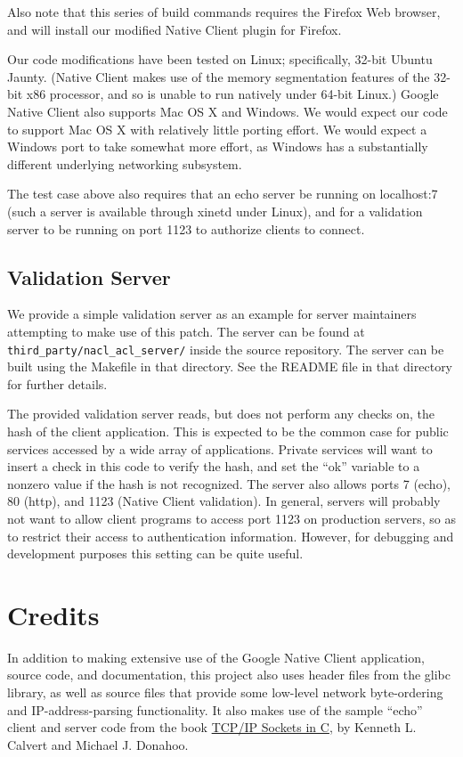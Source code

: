 \documentclass[a4paper,10pt]{article}
\begin{document}
Also note that this series of build commands requires the Firefox Web browser,
and will install our modified Native Client plugin for Firefox.

Our code modifications have been tested on Linux; specifically, 32-bit Ubuntu
Jaunty.  (Native Client makes use of the memory segmentation features of
the 32-bit x86 processor, and so is unable to run natively under 64-bit Linux.)
Google Native Client also supports Mac OS X and Windows. We would expect our
code to support Mac OS X with relatively little porting effort. We would expect
a Windows port to take somewhat more effort, as Windows has a substantially
different underlying networking subsystem.

The test case above also requires that an echo server be running on
localhost:7 (such a server is available through xinetd under Linux), and for a
validation server to be running on port 1123 to authorize clients to connect.

\subsection{Validation Server}

We provide a simple validation server as an example for server maintainers
attempting to make use of this patch.  The server can be found at
\texttt{third\_party/nacl\_acl\_server/} inside the source repository.  The
server can be built using the Makefile in that directory.  See the README file
in that directory for further details.

The provided validation server reads, but does not perform any checks on, the
hash of the client application.  This is expected to be the common case for
public services accessed by a wide array of applications.  Private services
will want to insert a check in this code to verify the hash, and set the ``ok''
variable to a nonzero value if the hash is not recognized.  The server also
allows ports 7 (echo), 80 (http), and 1123 (Native Client validation).  In
general, servers will probably not want to allow client programs to access port
1123 on production servers, so as to restrict their access to authentication
information. However, for debugging and development purposes this setting can be
quite useful.

\section{Credits}

In addition to making extensive use of the Google Native Client application,
source code, and documentation, this project also uses header files from
the glibc library,  as well as source files that provide some low-level network
byte-ordering and IP-address-parsing functionality.  It also makes use of the
sample ``echo'' client and server code from the book \underline{TCP/IP Sockets
in C}, by Kenneth L. Calvert and Michael J. Donahoo.
\end{document}
